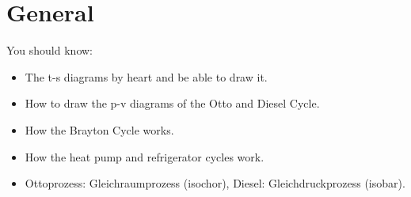 \section*{General}
You should know:
\begin{itemize}
    \item The t-s diagrams by heart and be able to draw it.
    \item How to draw the p-v diagrams of the Otto and Diesel Cycle.
    \item How the Brayton Cycle works.
    \item How the heat pump and refrigerator cycles work.
    \item Ottoprozess: Gleichraumprozess (isochor), Diesel: Gleichdruckprozess (isobar).


\end{itemize}


